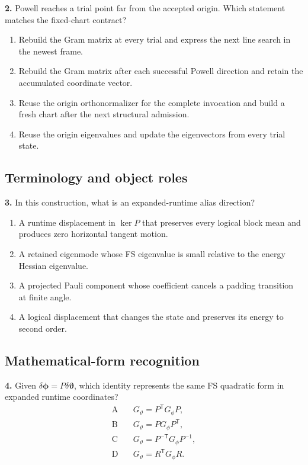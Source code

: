 \documentclass[10pt,twocolumn]{article}
\begin{document}
\textbf{2.} Powell reaches a trial point far from the accepted origin. Which
statement matches the fixed-chart contract?
\begin{enumerate}[label=\Alph*.,leftmargin=1.45em,itemsep=1pt,topsep=2pt]
\item Rebuild the Gram matrix at every trial and express the next line search
in the newest frame.
\item Rebuild the Gram matrix after each successful Powell direction and retain
the accumulated coordinate vector.
\item Reuse the origin orthonormalizer for the complete invocation and build a
fresh chart after the next structural admission.
\item Reuse the origin eigenvalues and update the eigenvectors from every trial
state.
\end{enumerate}

\subsection*{Terminology and object roles}

\textbf{3.} In this construction, what is an expanded-runtime alias direction?
\begin{enumerate}[label=\Alph*.,leftmargin=1.45em,itemsep=1pt,topsep=2pt]
\item A runtime displacement in \(\ker P\) that preserves every logical block
mean and produces zero horizontal tangent motion.
\item A retained eigenmode whose FS eigenvalue is small relative to the energy
Hessian eigenvalue.
\item A projected Pauli component whose coefficient cancels a padding
transition at finite angle.
\item A logical displacement that changes the state and preserves its energy
to second order.
\end{enumerate}

\subsection*{Mathematical-form recognition}

\textbf{4.} Given \(\delta\bm\phi=P\delta\bm\vartheta\), which identity
represents the same FS quadratic form in expanded runtime coordinates?
\begin{equation*}
\begin{aligned}
\mathrm A\quad&G_\vartheta=P^{\mathsf T}G_\phi P,\\
\mathrm B\quad&G_\vartheta=PG_\phi P^{\mathsf T},\\
\mathrm C\quad&G_\vartheta=P^{-\mathsf T}G_\phi P^{-1},\\
\mathrm D\quad&G_\vartheta=R^{\mathsf T}G_\phi R.
\end{aligned}
\end{equation*}
\end{document}
